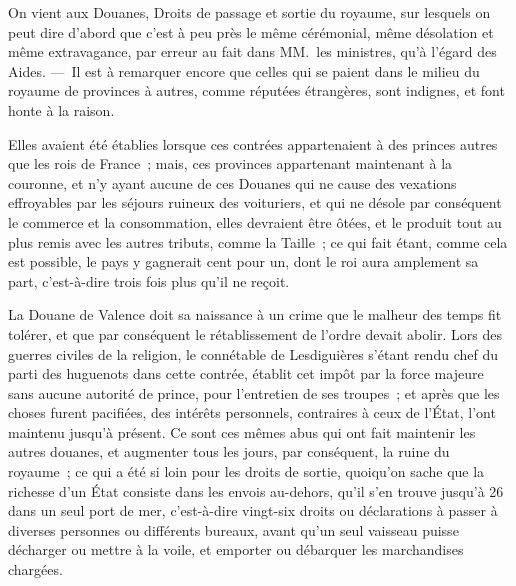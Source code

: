 \documentclass[french,twoside]{book} %
\begin{document}
On vient aux Douanes, Droits de passage et sortie du royaume, sur lesquels on peut dire d’abord que c’est à peu près le même cérémonial, même désolation et même extravagance, par erreur au fait dans MM. les ministres, qu’à l’égard des Aides. — Il est à remarquer encore que celles qui se paient dans le milieu du royaume de provinces à autres, comme réputées étrangères, sont indignes, et font honte à la raison.\par
Elles avaient été établies lorsque ces contrées appartenaient à des princes autres que les rois de France ; mais, ces provinces appartenant maintenant à la couronne, et n’y ayant aucune de ces Douanes qui ne cause des vexations effroyables par les séjours ruineux des voituriers, et qui ne désole par conséquent le commerce et la consommation, elles devraient être ôtées, et le produit tout au plus remis avec les autres tributs, comme la Taille ; ce qui fait étant, comme cela est possible, le pays y gagnerait cent pour un, dont le roi aura amplement sa part, c’est-à-dire trois fois plus qu’il ne reçoit.\par
La Douane de Valence doit sa naissance à un crime que le malheur des temps fit tolérer, et que par conséquent le rétablissement de l’ordre devait abolir. Lors des guerres civiles de la religion, le connétable de Lesdiguières s’étant rendu chef du parti des huguenots dans cette contrée, établit cet impôt par la force majeure sans aucune autorité de prince, pour l’entretien de ses troupes ; et après que les choses furent pacifiées, des intérêts personnels, contraires à ceux de l’État, l’ont maintenu jusqu’à présent. Ce sont ces mêmes abus qui ont fait maintenir les autres douanes, et augmenter tous les jours, par conséquent, la ruine du royaume ; ce qui a été si loin pour les droits de sortie, quoiqu’on sache que la richesse d’un État consiste dans les envois au-dehors, qu’il s’en trouve jusqu’à 26 dans un seul port de mer, c’est-à-dire vingt-six droits ou déclarations à passer à diverses personnes ou différents bureaux, avant qu’un seul vaisseau puisse décharger ou mettre à la voile, et emporter ou débarquer les marchandises chargées.\par
\end{document}
